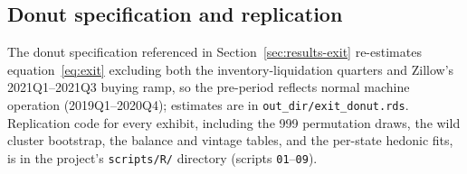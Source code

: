 

\subsection{Donut specification and replication}\label{app:donut}

The donut specification referenced in Section~\ref{sec:results-exit} re-estimates equation~\eqref{eq:exit} excluding both the inventory-liquidation quarters and Zillow's 2021Q1--2021Q3 buying ramp, so the pre-period reflects normal machine operation (2019Q1--2020Q4); estimates are in \texttt{out\_dir/exit\_donut.rds}. Replication code for every exhibit, including the 999 permutation draws, the wild cluster bootstrap, the balance and vintage tables, and the per-state hedonic fits, is in the project's \texttt{scripts/R/} directory (scripts \texttt{01}--\texttt{09}).
